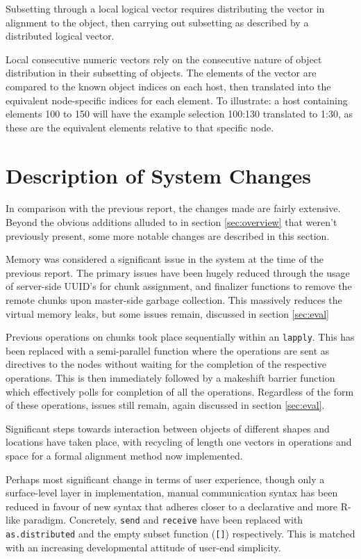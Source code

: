\documentclass[a4paper,10pt]{article}
\begin{document}
Subsetting through a local logical vector requires distributing the vector in
alignment to the object, then carrying out subsetting as described by a
distributed logical vector.

Local consecutive numeric vectors rely on the consecutive nature of object
distribution in their subsetting of objects.  
The elements of the vector are compared to the known object indices on each
host, then translated into the equivalent node-specific indices for each
element.  
To illustrate: a host containing elements 100 to 150 will have the example
selection 100:130 translated to 1:30, as these are the equivalent elements
relative to that specific node.

\section{Description of System Changes}

In comparison with the previous report, the changes made are fairly extensive.
Beyond the obvious additions alluded to in section \ref{sec:overview} that
weren't previously present, some more notable changes are described in this
section.

Memory was considered a significant issue in the system at the time of the
previous report.  
The primary issues have been hugely reduced through the usage of server-side
UUID's for chunk assignment, and finalizer functions to remove the remote
chunks upon master-side garbage collection.  
This massively reduces the virtual memory leaks, but some issues remain,
discussed in section \ref{sec:eval}

Previous operations on chunks took place sequentially within an
\texttt{lapply}.  
This has been replaced with a semi-parallel function where the operations are
sent as directives to the nodes without waiting for the completion of the
respective operations.  
This is then immediately followed by a makeshift barrier function which
effectively polls for completion of all the operations.  
Regardless of the form of these operations, issues still remain, again
discussed in section \ref{sec:eval}.

Significant steps towards interaction between objects of different shapes and
locations have taken place, with recycling of length one vectors in operations
and space for a formal alignment method now implemented.

Perhaps most significant change in terms of user experience, though only a
surface-level layer in implementation, manual communication syntax has been
reduced in favour of new syntax that adheres closer to a declarative and
more R-like paradigm.
Concretely, \texttt{send} and \texttt{receive} have been replaced with
\texttt{as.distributed} and the empty subset function (\texttt{[]})
respectively.
This is matched with an increasing developmental attitude of user-end
simplicity.
\end{document}
